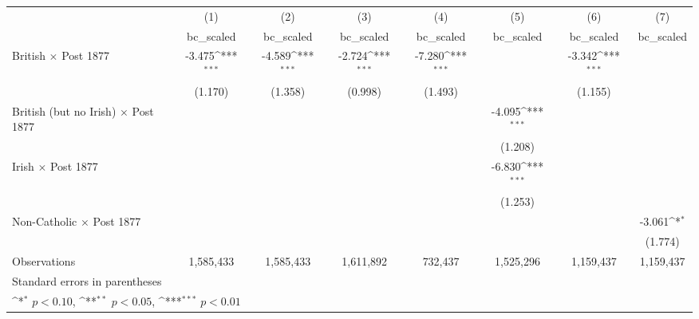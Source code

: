 {
\def\sym#1{\ifmmode^{#1}\else\(^{#1}\)\fi}
\begin{tabular}{l*{7}{c}}
\hline\hline
                    &\multicolumn{1}{c}{(1)}&\multicolumn{1}{c}{(2)}&\multicolumn{1}{c}{(3)}&\multicolumn{1}{c}{(4)}&\multicolumn{1}{c}{(5)}&\multicolumn{1}{c}{(6)}&\multicolumn{1}{c}{(7)}\\
                    &\multicolumn{1}{c}{bc\_scaled}&\multicolumn{1}{c}{bc\_scaled}&\multicolumn{1}{c}{bc\_scaled}&\multicolumn{1}{c}{bc\_scaled}&\multicolumn{1}{c}{bc\_scaled}&\multicolumn{1}{c}{bc\_scaled}&\multicolumn{1}{c}{bc\_scaled}\\
\hline
British $\times$ Post 1877&      -3.475\sym{***}&      -4.589\sym{***}&      -2.724\sym{***}&      -7.280\sym{***}&                     &      -3.342\sym{***}&                     \\
                    &     (1.170)         &     (1.358)         &     (0.998)         &     (1.493)         &                     &     (1.155)         &                     \\
[1em]
British (but no Irish) $\times$ Post 1877&                     &                     &                     &                     &      -4.095\sym{***}&                     &                     \\
                    &                     &                     &                     &                     &     (1.208)         &                     &                     \\
[1em]
Irish $\times$ Post 1877&                     &                     &                     &                     &      -6.830\sym{***}&                     &                     \\
                    &                     &                     &                     &                     &     (1.253)         &                     &                     \\
[1em]
Non-Catholic $\times$ Post 1877&                     &                     &                     &                     &                     &                     &      -3.061\sym{*}  \\
                    &                     &                     &                     &                     &                     &                     &     (1.774)         \\
\hline
Observations        &   1,585,433         &   1,585,433         &   1,611,892         &     732,437         &   1,525,296         &   1,159,437         &   1,159,437         \\
\hline\hline
\multicolumn{8}{l}{\footnotesize Standard errors in parentheses}\\
\multicolumn{8}{l}{\footnotesize \sym{*} \(p<0.10\), \sym{**} \(p<0.05\), \sym{***} \(p<0.01\)}\\
\end{tabular}
}
